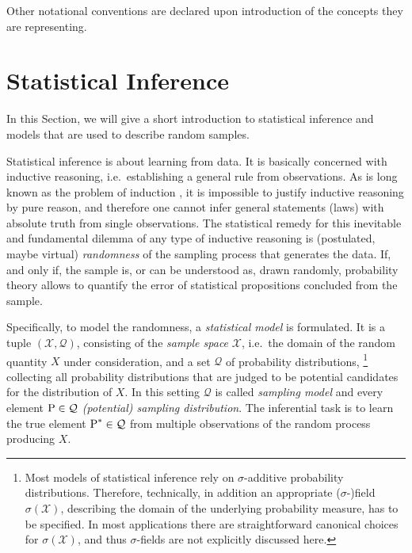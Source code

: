 Other notational conventions are declared upon introduction of the concepts they are representing.


\section{Statistical Inference}
\label{sec:stat-inference}


In this Section, we will give a short introduction to statistical inference
and models that are used to describe random samples.

Statistical inference is about learning from data.
It is basically concerned with inductive reasoning,
i.e.\ establishing a general rule from observations.
As is long known as the problem of induction \parencite{1739:hume},
it is impossible to justify inductive reasoning by pure reason,
and therefore one cannot infer general statements (laws) with absolute truth from single observations.
The statistical remedy for this inevitable and fundamental dilemma of any type of inductive reasoning is
(postulated, maybe virtual) \emph{randomness} of the sampling process that generates the data.
If, and only if, the sample is, or can be understood as, drawn randomly,
probability theory allows to quantify the error of statistical propositions concluded from the sample.

Specifically, to model the randomness, a \emph{statistical model} is formulated.
It is a tuple $(\mathcal{X}, \mathcal{Q})$, consisting of the \emph{sample space} $\mathcal{X}$,
i.e.\ the domain of the random quantity $X$ under consideration,
and a set $\mathcal{Q}$ of probability distributions,%
\footnote{Most models of statistical inference rely on $\sigma$-additive probability distributions.
Therefore, technically, in addition an appropriate ($\sigma$-)field $\sigma(\mathcal{X})$,
describing the domain of the underlying probability measure, has to be specified.
In most applications there are straightforward canonical choices for $\sigma(\mathcal{X})$,
and thus $\sigma$-fields are not explicitly discussed here.}
collecting all probability distributions that are judged to be potential candidates for the distribution of $X$.
In this setting $\mathcal{Q}$ is called \emph{sampling model} and every element $\operatorname{P}\in \mathcal{Q}$ \emph{(potential) sampling distribution}.
The inferential task is to learn the true element $\operatorname{P}^* \in \mathcal{Q}$ from multiple observations of the random process producing $X$.


